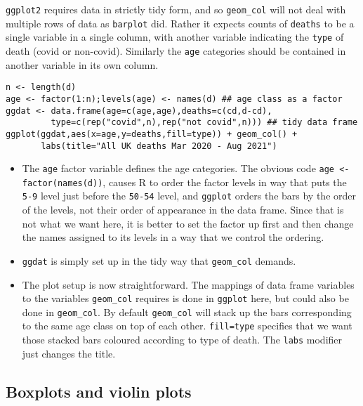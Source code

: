 \documentclass[10pt] {article}
\newcommand{\eps}[3]
{{\begin{center}
 \rotatebox{#1}{\scalebox{#2}{\texttt{[image: \#3]}}}
 \end{center}}
}
\theoremstyle{definition}
\begin{document}
{\tt ggplot2} requires data in strictly tidy form, and so \lstinline+geom_col+ will not deal with multiple rows of data as \lstinline+barplot+ did. Rather it expects counts of {\tt deaths} to be a single variable in a single column, with another variable indicating the {\tt type} of death (covid or non-covid). Similarly the {\tt age} categories should be contained in another variable in its own column.   
\begin{lstlisting}
n <- length(d)
age <- factor(1:n);levels(age) <- names(d) ## age class as a factor
ggdat <- data.frame(age=c(age,age),deaths=c(cd,d-cd),
         type=c(rep("covid",n),rep("not covid",n))) ## tidy data frame
ggplot(ggdat,aes(x=age,y=deaths,fill=type)) + geom_col() +
       labs(title="All UK deaths Mar 2020 - Aug 2021")
\end{lstlisting}
\eps{0}{.5}{deaths3.eps} 
\begin{itemize}
\item The {\tt age} factor variable defines the age categories. The obvious code \lstinline+age <- factor(names(d))+, causes R to order the factor levels in way that puts the \verb+5-9+ level just before the \verb+50-54+ level, and {\tt ggplot} orders the bars by the order of the levels, not their order of appearance in the data frame. Since that is not what we want here, it is better to set the factor up first and then change the names assigned to its levels in a way that we control the ordering.
\item \lstinline+ggdat+ is simply set up in the tidy way that \lstinline+geom_col+ demands.
\item The plot setup is now straightforward. The mappings of data frame variables to the variables \lstinline+geom_col+ requires is done in \lstinline+ggplot+ here, but could also be done in \lstinline+geom_col+. By default  \lstinline+geom_col+ will stack up the bars corresponding to the same age class on top of each other. \lstinline+fill=type+ specifies that we want those stacked bars coloured according to type of death. The \lstinline+labs+ modifier just changes the title.    
\end{itemize}


\subsection{Boxplots and violin plots}
\end{document}
